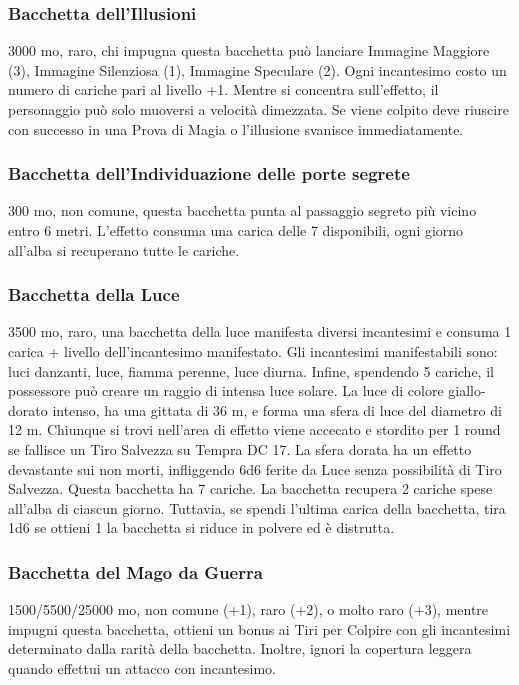 \begin{multicols}{2}
	\subsubsection*{Bacchetta dell'Illusioni}
	3000 mo, raro, chi impugna questa bacchetta può lanciare Immagine Maggiore (3), Immagine Silenziosa (1), Immagine Speculare (2). Ogni incantesimo costo un numero di cariche pari al livello +1. Mentre si concentra sull’effetto, il personaggio può solo muoversi a velocità dimezzata. Se viene colpito deve riuscire con successo in una Prova di Magia o l’illusione svanisce immediatamente.

	\subsubsection*{Bacchetta dell'Individuazione delle porte segrete}
	300 mo, non comune, questa bacchetta punta al passaggio segreto più vicino entro 6 metri. L'effetto consuma una carica delle 7 disponibili, ogni giorno all'alba si recuperano tutte le cariche.

	\subsubsection*{Bacchetta della Luce}
	3500 mo, raro, una bacchetta della luce manifesta diversi incantesimi e consuma 1 carica + livello dell'incantesimo manifestato. Gli incantesimi manifestabili sono: luci danzanti, luce, fiamma perenne, luce diurna. Infine, spendendo 5 cariche, il possessore può creare un raggio di intensa luce solare. La luce di colore giallo-dorato intenso, ha una gittata di 36 m, e forma una sfera di luce del diametro di 12 m. Chiunque si trovi nell'area di effetto viene accecato e stordito per 1 round se fallisce un Tiro Salvezza su Tempra DC 17. La sfera dorata ha un effetto devastante sui non morti, infliggendo 6d6 ferite da Luce senza possibilità di Tiro Salvezza. Questa bacchetta ha 7 cariche. La bacchetta recupera 2 cariche spese all'alba di ciascun giorno. Tuttavia, se spendi l'ultima carica della bacchetta, tira 1d6 se ottieni 1 la bacchetta si riduce in polvere ed è distrutta.

	\subsubsection*{Bacchetta del Mago da Guerra}
	1500/5500/25000 mo, non comune (+1), raro (+2), o molto raro (+3), mentre impugni questa bacchetta, ottieni un bonus ai Tiri per Colpire con gli incantesimi determinato dalla rarità della bacchetta. Inoltre, ignori la copertura leggera quando effettui un attacco con incantesimo.


\end{multicols}
